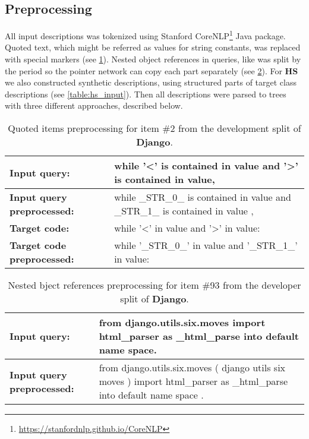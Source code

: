 
\subsection{Preprocessing} \label{preprocessing}

All input descriptions was tokenized using Stanford CoreNLP\footnote{\href{https://stanfordnlp.github.io/CoreNLP}{https://stanfordnlp.github.io/CoreNLP}} Java package. Quoted text, which might be referred as values for string constants, was replaced with special markers (see \cref{table:str_markers}). Nested object references in queries, like  was split by the period so the pointer network can copy each part separately (see \cref{table:function_calls}). For \textbf{HS} we also constructed synthetic descriptions, using structured parts of target class descriptions (see \cref{table:hs_input}). Then all descriptions were parsed to trees with three different approaches, described below.

\begin{table}
\begin{tabularx}{\textwidth}{ l X }
\hline
\textbf{Input query:} & while '<' is contained in value and '>' is contained in value, \\
\hline 
\textbf{Input query preprocessed:} & while \_STR\_0\_ is contained in value and \_STR\_1\_ is contained in value , \\
\hline 
\textbf{Target code:} & while '<' in value and '>' in value: \\
\hline 
\textbf{Target code preprocessed:} & while '\_STR\_0\_' in value and '\_STR\_1\_' in value: \\
\hline
\end{tabularx}
\caption[Quoted items preprocessing]{Quoted items preprocessing for item \#2 from the development split of \textbf{Django}.}
\label{table:str_markers}
\end{table}

\begin{table}
\begin{tabularx}{\textwidth}{ l X }
\hline
\textbf{Input query:} & from django.utils.six.moves import html\_parser as \_html\_parse into default name space. \\
\hline 
\textbf{Input query preprocessed:} & from django.utils.six.moves ( django utils six moves ) import html\_parser as \_html\_parse into default name space . \\
\hline 
\end{tabularx}
\caption[Nested object references preprocessing]{Nested bject references preprocessing for item \#93 from the developer split of \textbf{Django}.}
\label{table:function_calls}
\end{table}

